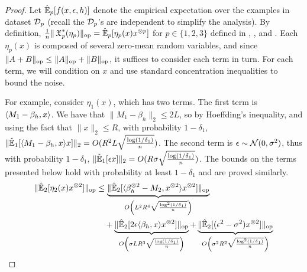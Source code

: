\begin{proof}
Let $\hat{\operatorname{\mathbb{E}}}_p[f(x,\epsilon,h)]$ denote the empirical expectation over
the examples in dataset $\mathcal{D}_p$ (recall the $\mathcal{D}_p$'s are independent to
simplify the analysis).  By definition,
$\frac1n \|\operatorname{\mathfrak{X}}_p^*(\eta_p)\|_{\text{\rm op}} = \hat{\operatorname{\mathbb{E}}}_p[\eta_p(x) x^{\otimes p}]$
for $p \in \{1,2,3\}$ defined in , , and
. Each $\eta_p(x)$ is composed of several zero-mean random
variables, and since $\|A + B\|_{\text{\rm op}} \le \|A\|_{\text{\rm op}} + \|B\|_{\text{\rm op}}$, it
suffices to consider each term in turn. 
For each term, we will
condition on $x$ and use standard concentration inequalities to bound
the noise. 

For example, consider $\eta_1(x)$, which has two terms. 
The first term is $\langle M_1 - \beta_h, x \rangle$.  We have that $\|M_1 - \beta_h\|_2 \le 2L$, so by Hoeffding's inequality, and using the fact that $\|x\|_2 \le R$, with probability $1-\delta_1$, $\|\hat{\operatorname{\mathbb{E}}}_1[\langle M_1 - \beta_h, x \rangle x]\|_2 = O(R^2 L \sqrt{\frac{\log(1/\delta_1)}{n}})$. 
The second term is $\epsilon \sim \mathcal{N}(0, \sigma^2)$, thus with probability $1-\delta_1$, $\|\hat{\operatorname{\mathbb{E}}}_1[\epsilon x]\|_2 = O(R \sigma \sqrt{\frac{\log(1/\delta_1)}{n}})$. 
The bounds on the terms presented below hold with probability at least $1-\delta_1$ and are proved similarly.
{\scriptsize
\begin{align*}
    \| \hat\E_2[ \eta_2(x) x\tp{2} ] \|_\Lop &\le 
            \underbrace{ \|\hat\E_2[\innerp{\beta_h\tp{2} - M_2}{x\tp{2}} x\tp{2}]\|_\op }_{ O\left( L^2 R^4      \sqrt{\frac{\log^2(1/\delta_1)}{n}} \right) } \\
   &\quad + \underbrace{ \|\hat\E_2[2 \epsilon \innerp{\beta_h}{x} x\tp{2}]\|_\op        }_{ O\left( \sigma L R^3 \sqrt{\frac{\log  (1/\delta_1)}{n}} \right) } 
          + \underbrace{ \|\hat\E_2[(\epsilon^2 - \sigma^2) x\tp{2}]\|_\op               }_{ O\left( \sigma^2 R^2 \sqrt{\frac{\log^2(1/\delta_1)}{n}} \right) } \\

\end{align*}}
\end{proof}
